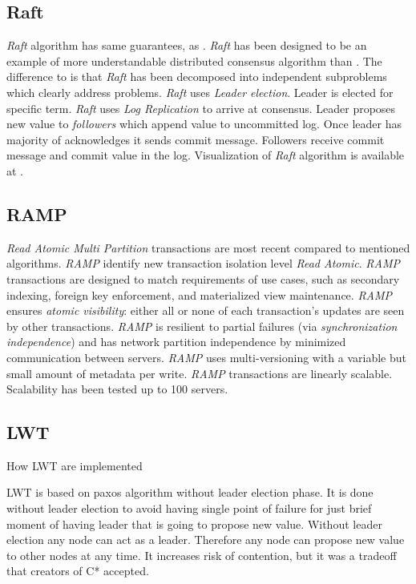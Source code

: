 \subsection{Raft}
\emph{Raft} algorithm has same guarantees, as \paxos. \emph{Raft} has been designed to be an example of more understandable distributed consensus algorithm than \paxos. \cite{ongaro2014search} The difference to \paxos  is that \emph{Raft} has been decomposed into independent subproblems which clearly address problems. \emph{Raft} uses \emph{Leader election}. Leader is elected for specific term. \emph{Raft} uses \emph{Log Replication} to arrive at consensus. Leader proposes new value to \emph{followers} which append value to uncommitted log. Once leader has majority of acknowledges it sends commit message. Followers receive commit message and commit value in the log. Visualization of \emph{Raft} algorithm is available at \cite{raftVisual}.

\subsection{RAMP}\label{sec:theory:transactions:ramp}
\emph{Read Atomic Multi Partition} transactions \cite{Bailis:2014} are most recent compared to mentioned algorithms. \emph{RAMP} identify new transaction isolation level \emph{Read Atomic}. \emph{RAMP} transactions are designed to match requirements of use cases, such as secondary indexing, foreign key
enforcement, and materialized view maintenance. \emph{RAMP} ensures \emph{atomic visibility}: either all or none of each transaction's updates are seen by other transactions. \emph{RAMP} is resilient to partial failures (via \emph{synchronization independence}) and has network partition independence by minimized communication between servers. \emph{RAMP} uses multi-versioning with a variable but small amount of metadata per write. \emph{RAMP} transactions are linearly scalable. Scalability has been tested up to 100 servers.

\subsection{LWT}\label{sec:theory:transactions:lwt}

 How LWT are implemented


LWT is based on paxos algorithm without leader election phase. It is done without leader election to avoid having single point of failure for just brief moment of having leader that is going to propose new value. Without leader election any node can act as a leader. Therefore any node can propose new value to other nodes at any time. It increases risk of contention, but it was a tradeoff that creators of C* accepted. 


